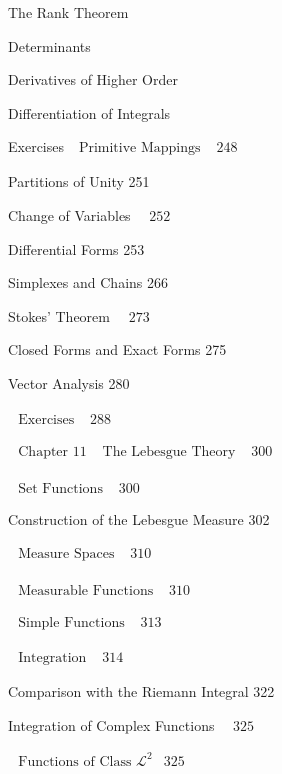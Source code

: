 \documentclass[10pt]{article}
\begin{document}
The Rank Theorem

Determinants

Derivatives of Higher Order

Differentiation of Integrals

Exercises $\begin{array}{ll}\text { Primitive Mappings } & 248\end{array}$

Partitions of Unity 251

Change of Variables $\quad 252$

Differential Forms 253

Simplexes and Chains 266

Stokes' Theorem $\quad 273$

Closed Forms and Exact Forms 275

Vector Analysis 280

$\begin{array}{ll}\text { Exercises } & 288\end{array}$

$\begin{array}{lll}\text { Chapter } 11 & \text { The Lebesgue Theory } & 300\end{array}$

$\begin{array}{ll}\text { Set Functions } & 300\end{array}$

Construction of the Lebesgue Measure 302

$\begin{array}{ll}\text { Measure Spaces } & 310\end{array}$

$\begin{array}{ll}\text { Measurable Functions } & 310\end{array}$

$\begin{array}{ll}\text { Simple Functions } & 313\end{array}$

$\begin{array}{ll}\text { Integration } & 314\end{array}$

Comparison with the Riemann Integral 322

Integration of Complex Functions $\quad 325$

$\begin{array}{ll}\text { Functions of Class } \mathscr{L}^{2} & 325 \\ \end{array}$
\end{document}
